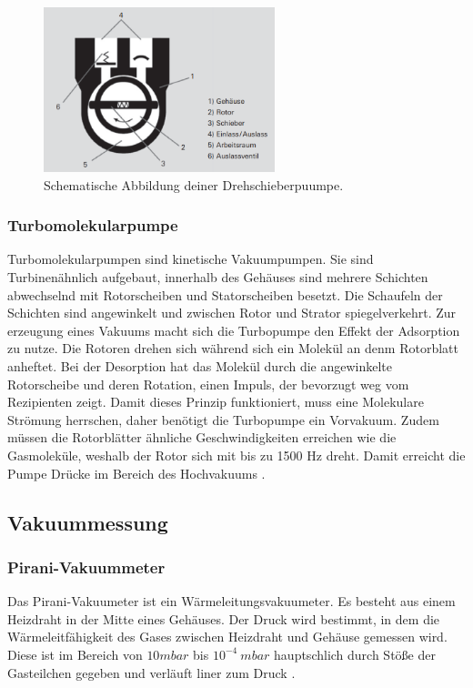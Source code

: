     \begin{figure}
        \centering
        \label{fig:Drehschieberpumpe}
        \includegraphics[width=0.6\textwidth]{Drehschieberpumpe.png}
        \caption{Schematische Abbildung deiner Drehschieberpuumpe.}
    \end{figure}

\subsubsection{Turbomolekularpumpe}
Turbomolekularpumpen sind kinetische Vakuumpumpen.
Sie sind Turbinenähnlich aufgebaut, innerhalb des Gehäuses sind mehrere Schichten abwechselnd mit Rotorscheiben und Statorscheiben besetzt.
Die Schaufeln der Schichten sind angewinkelt und zwischen Rotor und Strator spiegelverkehrt. 
Zur erzeugung eines Vakuums macht sich die Turbopumpe den Effekt der Adsorption zu nutze. Die Rotoren drehen sich während sich ein Molekül an denm Rotorblatt 
anheftet. Bei der Desorption hat das Molekül durch die angewinkelte Rotorscheibe und deren Rotation, einen Impuls, der bevorzugt weg vom Rezipienten zeigt.
Damit dieses Prinzip funktioniert, muss eine Molekulare Strömung herrschen, daher benötigt die Turbopumpe ein Vorvakuum. Zudem müssen die Rotorblätter ähnliche Geschwindigkeiten 
erreichen wie die Gasmoleküle, weshalb der Rotor sich mit bis zu 1500 Hz dreht.
Damit erreicht die Pumpe Drücke im Bereich des Hochvakuums \cite{Pfeiffer, S.83,84}.


\subsection{Vakuummessung}
\subsubsection{Pirani-Vakuummeter}
Das Pirani-Vakuumeter ist ein Wärmeleitungsvakuumeter. Es besteht aus einem Heizdraht in der Mitte eines Gehäuses.
Der Druck wird bestimmt, in dem die Wärmeleitfähigkeit des Gases zwischen Heizdraht und Gehäuse gemessen wird. 
Diese ist im Bereich von $10 mbar$ bis $10^{-4}\: mbar$ hauptschlich durch Stöße der Gasteilchen gegeben und verläuft liner zum Druck \cite{Pfeiffer, S.93,94}.


